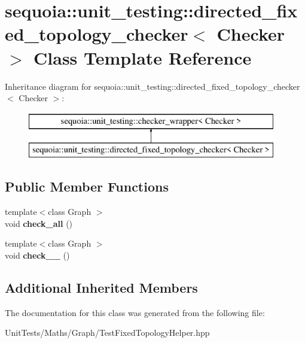 \hypertarget{classsequoia_1_1unit__testing_1_1directed__fixed__topology__checker}{}\section{sequoia\+::unit\+\_\+testing\+::directed\+\_\+fixed\+\_\+topology\+\_\+checker$<$ Checker $>$ Class Template Reference}
\label{classsequoia_1_1unit__testing_1_1directed__fixed__topology__checker}
Inheritance diagram for sequoia\+::unit\+\_\+testing\+::directed\+\_\+fixed\+\_\+topology\+\_\+checker$<$ Checker $>$\+:\begin{figure}[H]
\begin{center}
\leavevmode
\includegraphics[height=2.000000cm]{classsequoia_1_1unit__testing_1_1directed__fixed__topology__checker}
\end{center}
\end{figure}
\subsection*{Public Member Functions}
\begin{DoxyCompactItemize}
\item 
\mbox{\label{classsequoia_1_1unit__testing_1_1directed__fixed__topology__checker_a120a79a8bfb51c3bc1582d176da3f842}} 
{\footnotesize template$<$class Graph $>$ }\\void {\bfseries check\+\_\+all} ()
\item 
\mbox{\label{classsequoia_1_1unit__testing_1_1directed__fixed__topology__checker_a9ab7c036db304c039239e4ee6605eb6b}} 
{\footnotesize template$<$class Graph $>$ }\\void {\bfseries check\+\_\+\_} ()
\end{DoxyCompactItemize}
\subsection*{Additional Inherited Members}


The documentation for this class was generated from the following file\+:\begin{DoxyCompactItemize}
\item 
Unit\+Tests/\+Maths/\+Graph/Test\+Fixed\+Topology\+Helper.\+hpp\end{DoxyCompactItemize}
